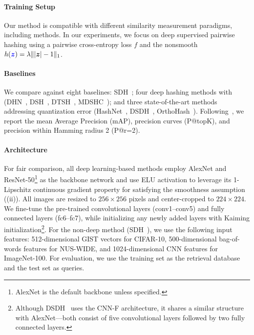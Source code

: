 \paragraph{Training Setup} Our method is compatible with different similarity measurement paradigms, including  methods. In our experiments, we focus on deep supervised pairwise hashing using a pairwise cross-entropy loss \( f \) and the nonsmooth  \( h({\color{blue}\bm{z}}) = \lambda \| |\bm{z}| -1 \|_1 \).

\paragraph{Baselines} We compare against eight baselines: SDH~\cite{shenSupervisedDiscreteHashing2015}; four deep hashing methods with  (DHN~\cite{zhuDeepHashingNetwork2016}, DSH~\cite{liuDeepSupervisedHashing}, DTSH~\cite{wang2016DTSH}, MDSHC~\cite{wang2023deep}); 
and three state-of-the-art methods addressing quantization error (HashNet~\cite{Cao2017HashNetDL}, DSDH~\cite{li2017deep}, OrthoHash~\cite{hoeOneLossAll2021}). Following~\cite{liuDeepSupervisedHashing}, we report the mean Average Precision (mAP), precision curves (P@topK), and precision within Hamming radius 2 (P@r=2).

\paragraph{Architecture} For fair comparison, all deep learning-based methods employ AlexNet and ResNet-50\footnote{AlexNet is the default backbone unless specified.} as the 
backbone network and use ELU activation to leverage its 
1-Lipschitz continuous gradient property for satisfying the smoothness assumption ((ii)).
All images are resized to $256 \times 256$ pixels and center-cropped to 
$224 \times 224$. We fine-tune the pre-trained convolutional layers 
(conv1--conv5) and fully connected layers (fc6--fc7), while initializing 
any newly added layers with Kaiming initialization\footnote{Although DSDH~\cite{li2017deep} uses the CNN-F architecture, it shares a similar structure with AlexNet—both consist of five convolutional layers followed by two fully connected layers.}.
For the non-deep method (SDH~\cite{shenSupervisedDiscreteHashing2015}), we use the following input features: 512-dimensional GIST vectors for CIFAR-10, 500-dimensional bag-of-words features for NUS-WIDE, and 1024-dimensional CNN features for ImageNet-100. For evaluation, we use the training set as the retrieval database and the test set as queries.

